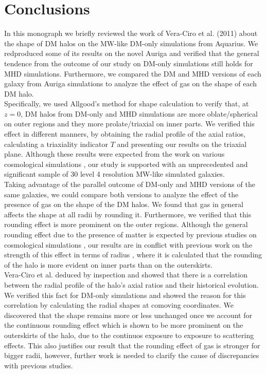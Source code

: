 \chapter{Conclusions}


In this monograph we briefly reviewed the work of Vera-Ciro et al. (2011) \cite{Vera Ciro 2011} about the shape of DM halos on the MW-like DM-only simulations from Aquarius. We redproduced some of its results on the novel Auriga and verified that the general tendence from the outcome of our study on DM-only simulations still holds for MHD simulations. Furthermore, we compared the DM and MHD versions of each galaxy from Auriga simulations to analyze the effect of gas on the shape of each DM halo.\\

Specifically, we used Allgood's method for shape calculation to verify that, at $z=0$, DM halos from DM-only and MHD simulations are more oblate/spherical on outer regions and they more prolate/triaxial on inner parts. We verified this effect in different manners, by obtaining the radial profile of the axial ratios, calculating a triaxiality indicator $T$ and presenting our results on the triaxial plane. Although these results were expected from the work on various cosmological simulations \cite{various}, our study is supported with an unprecedented and significant sample of 30 level 4 resolution MW-like simulated galaxies.\\

Taking advantage of the parallel outcome of DM-only and MHD versions of the same galaxies, we could compare both versions to analyze the effect of the presence of gas on the shape of the DM halos. We found that gas in general affects the shape at all radii by rounding it. Furthermore, we verified that this rounding effect is more prominent on the outer regions. Although the general rounding effect due to the presence of matter is expected by previous studies on cosmological simulations \cite{}, our results are in conflict with previous work on the strength of this effect in terms of radius \cite{}, where it is calculated that the rounding of the halo is more evident on inner parts than on the outerskirts.\\

Vera-Ciro et al. deduced by inspection and showed that there is a correlation between the radial profile of the halo's axial ratios and their historical evolution. We verified this fact for DM-only simulations and showed the reason for this correlation by calculating the radial shapes at comoving coordinates. We discovered that the shape remains more or less unchanged once we account for the continuous rounding effect which is shown to be more prominent on the outerskirts of the halo, due to the continuos exposure to exposure to scattering effects. This also justifies our result that the rounding effect of gas is stronger for bigger radii, however, further work is needed to clarify the cause of discrepancies with previous studies.\\


